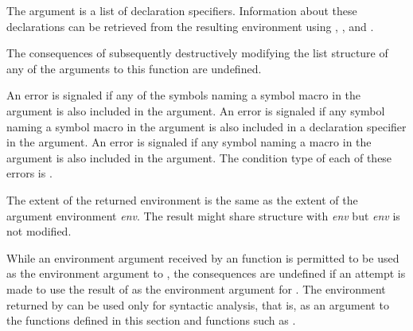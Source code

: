 \begin{defun}[Function]
\begin{flushdesc}
\item[\cd{:declare}]
      The argument is a list of declaration specifiers.
      Information about these declarations can
                be retrieved from the resulting environment using
                , , and
                .
\end{flushdesc}
  The consequences of subsequently
  destructively modifying the list
  structure of any of the arguments to this function are undefined.

  An error is signaled if any of the symbols naming a symbol macro in the
   argument is also included in the  argument.
  An error is
  signaled if any symbol naming a symbol macro in the  argument is
  also included in a  declaration specifier in the  argument.
  An error is
  signaled if any symbol naming a macro in the  argument is also included
  in the  argument.
  The condition type of each of these errors is .

  The extent of the returned environment is the same as the extent of the
  argument environment \emph{env}.  The result might share structure with \emph{env}
  but \emph{env} is not modified.

  While an environment argument received by an 
  function is permitted to be used as the
  environment argument to , the consequences are undefined if an
  attempt is made to use the result of  as the environment
  argument for .  The environment
  returned by  can be used only for syntactic analysis, that is,
  as an argument to
  the functions defined in this section and functions such as .
\end{defun}

